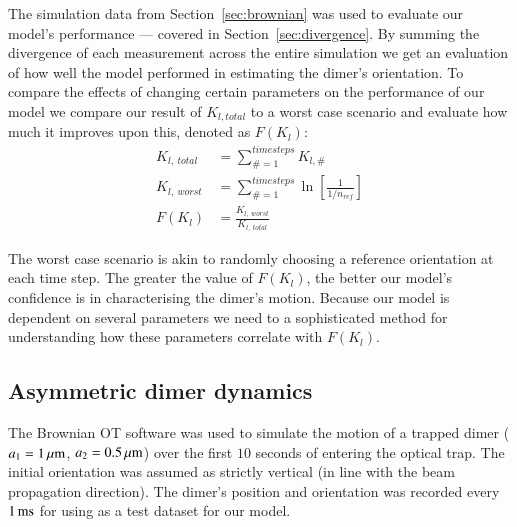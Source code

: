 \documentclass[final,  3p]{elsarticle}
\begin{document}
The simulation data from Section~\ref{sec:brownian} was used to evaluate our model's performance --- covered in Section~\ref{sec:divergence}. By summing the divergence of each measurement across the entire simulation we get an evaluation of how well the model performed in estimating the dimer's orientation. To compare the effects of changing certain parameters on the performance of our model we compare our result of $K_{l,total}$ to a worst case scenario and evaluate how much it improves upon this, denoted as $F(K_l)$:
\begin{align}
  K_{l, \ total} &= \sum\limits_{\# =1}^{timesteps} K_{l,\#}
  \\
  K_{l, \ worst} &= \sum\limits_{\#=1}^{timesteps} \ln \left[\frac{1}{1/n_{ref}} \right]
  \\
F(K_l) &= \frac{K_{l,\ worst}}{K_{l, \ total}}
\end{align}

The worst case scenario is akin to randomly choosing a reference
orientation at each time step. The greater the value of $F(K_l)$, the
better our model's confidence is in characterising the dimer's
motion. Because our model is dependent on several parameters we need
to a sophisticated method for understanding how these parameters
correlate with $F(K_l)$.


\subsection{Asymmetric dimer dynamics}
\label{sec:motion}

The Brownian OT software was used to simulate the motion of a trapped
dimer ($a_1=1\,\mu{\rm m}$, $a_2=0.5\,\mu{\rm m}$) over the first
$10$ seconds of entering the optical trap.  The initial orientation
was assumed as strictly vertical (in line with the beam propagation
direction). The dimer's position and orientation was recorded every
$1\,{\rm ms}$ for using as a test dataset for our model.
\end{document}
